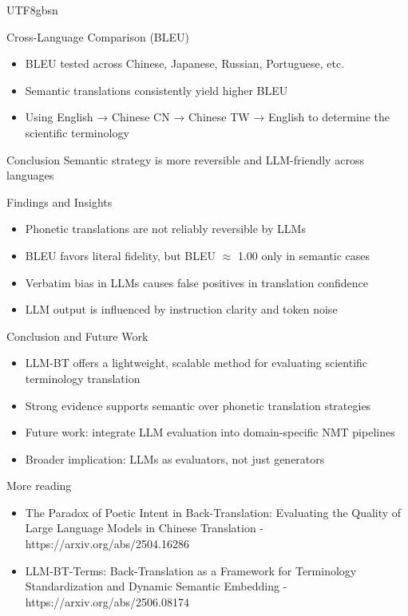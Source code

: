 \documentclass{beamer}
\begin{document}
\begin{CJK*}{UTF8}{gbsn}
\begin{frame}{Cross-Language Comparison (BLEU)}
\begin{itemize}
    \item BLEU tested across Chinese, Japanese, Russian, Portuguese, etc. 
    \item Semantic translations consistently yield higher BLEU
    \item Using English → Chinese CN → Chinese TW → English to determine the scientific terminology
\end{itemize}

\vspace{0.4cm}
\begin{block}{Conclusion}
    Semantic strategy is more reversible and LLM-friendly across languages
\end{block}
\end{frame}

\begin{frame}{Findings and Insights}
\begin{itemize}
    \item Phonetic translations are not reliably reversible by LLMs
    \item BLEU favors literal fidelity, but BLEU $\approx$ 1.00 only in semantic cases
    \item Verbatim bias in LLMs causes false positives in translation confidence
    \item LLM output is influenced by instruction clarity and token noise
\end{itemize}
\end{frame}

\begin{frame}{Conclusion and Future Work}
\begin{itemize}
    \item LLM-BT offers a lightweight, scalable method for evaluating scientific terminology translation
    \item Strong evidence supports semantic over phonetic translation strategies
    \item Future work: integrate LLM evaluation into domain-specific NMT pipelines
    \item Broader implication: LLMs as evaluators, not just generators
\end{itemize}
\end{frame}

\begin{frame}{More reading}
\begin{itemize}
    \item The Paradox of Poetic Intent in Back-Translation: Evaluating the Quality of Large Language Models in Chinese Translation - https://arxiv.org/abs/2504.16286
    \item LLM-BT-Terms: Back-Translation as a Framework for Terminology Standardization and Dynamic Semantic Embedding - https://arxiv.org/abs/2506.08174


\end{itemize}
\end{frame}
\end{CJK*}
\end{document}
